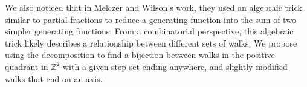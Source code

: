 \documentclass[letterpaper]{article}
\begin{document}
\begin{description}
We also noticed that in Melczer and Wilson's work, they used an algebraic trick similar to partial fractions to reduce a generating function into the sum of two simpler generating functions.  From a combinatorial perspective, this algebraic trick likely describes a relationship between different sets of walks.  We propose using the decomposition to find a bijection between walks in the positive quadrant in $\mathbb{Z}^2$ with a given step set ending anywhere, and slightly modified walks that end on an axis.
\end{description}
\thispagestyle{empty}
%
%
%
%
%
%
%
%
%
%
%
%
%
%
%
%
%
%
\end{document}
